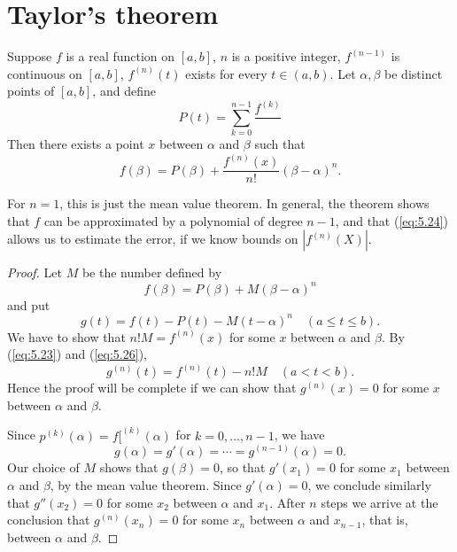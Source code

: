 \section{Taylor's theorem}

\begin{thm}
    \label{thm:5.15}
    Suppose $f$ is a real function on $[a, b]$, 
    $n$ is a positive integer,
    $f^{(n-1)}$ is continuous on $[a, b]$,
    $f^{(n)}(t)$ exists for every $t \in (a, b)$. 
    Let $\alpha, \beta$ be distinct points of $[a, b]$, 
    and define
    \begin{equation}
        \label{eq:5.23}
        P(t) = \sum_{k=0}^{n-1}\frac{f^{(k)}}{}
    \end{equation}
    Then there exists a point $x$ between $\alpha$ and $\beta$ such that
    \begin{equation}
        \label{eq:5.24}
        f(\beta) = 
        P(\beta)
        + \frac{f^{(n)}(x)}{n!}\left( \beta - \alpha \right)^n.
    \end{equation}
\end{thm}

For $n = 1$, this is just the mean value theorem. 
In general, the theorem shows that $f$ can be approximated by a polynomial of degree $n - 1$, 
and that (\ref{eq:5.24}) allows us to estimate the error, 
if we know bounds on $\left| f^{(n)}(X) \right| $.
\begin{proof}
    Let $M$ be the number defined by
    \begin{equation}
        \label{eq:5.25}
        f(\beta) = P(\beta) + M(\beta - \alpha)^n
    \end{equation}
    and put
    \begin{equation}
        \label{eq:5.26}
        g(t) =f(t) -P(t) - M(t -\alpha)^n
        \quad (a \leq t \leq b).
    \end{equation}
    We have to show that $n!M = f^{(n)}(x)$ 
    for some $x$ between $\alpha$ and $\beta$. 
    By (\ref{eq:5.23}) and (\ref{eq:5.26}),
    \begin{equation}
        \label{eq:5.27}
        g^{(n)}(t) = 
        f^{(n)}(t) - n! M
        \quad (a < t < b).
    \end{equation}
    Hence the proof will be complete if we can show that $g^{(n)}(x) = 0$ for some $x$ between $\alpha$ and $\beta$.
    
    Since $p^{(k)}(\alpha) =f[^{(k)}(\alpha)$ for $k= 0, ... , n - 1$, 
    we have
    \begin{equation}
        \label{eq:5.28}
        g(\alpha) = g'(\alpha) = \cdots = g^{(n-1)}(\alpha) = 0.
    \end{equation}
    Our choice of $M$ shows that $g(\beta) = 0$, 
    so that $g'(x_1) = 0$ for some $x_1$ between $\alpha$ and $\beta$, 
    by the mean value theorem. 
    Since $g'(\alpha) = 0$, we conclude similarly that 
    $g''(x_2) = 0$ for some $x_2$ between $\alpha$ and $x_1$. 
    After $n$ steps we arrive at the conclusion that 
    $g^{(n)}(x_n) = 0$ for some $x_n$ between $\alpha$ and $x_{n-1}$, 
    that is, between $\alpha$ and $\beta$.
\end{proof}